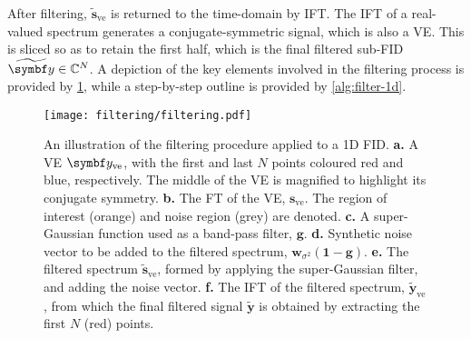 After filtering, $\widetilde{\symbf{s}}_{\text{ve}}$ is returned to the
time-domain by \ac{IFT}. The \ac{IFT} of a real-valued spectrum generates a
conjugate-symmetric signal, which is also a \ac{VE}. This is sliced so as to
retain the first half, which is the final filtered sub-FID $\widetilde{\by} \in
\mathbb{C}^{N}$.
A depiction of the key elements involved in the filtering process is provided
by \cref{fig:filtering}, while a step-by-step outline is provided by
\cref{alg:filter-1d}.
\begin{figure}
     \centering
     \texttt{[image: filtering/filtering.pdf]}
     \caption[
         An illustration of the filtering procedure applied to a \acs{1D}
         \acs{FID}.
     ]{
         An illustration of the filtering procedure applied to a \ac{1D}
         \ac{FID}.
         \textbf{a.} A \ac{VE} $\by_{\text{ve}}$, with the first and last
         $N$ points coloured red and blue, respectively. The middle of the
         \ac{VE} is magnified to highlight its conjugate symmetry.
         \textbf{b.} The \ac{FT} of the \ac{VE}, $\symbf{s}_{\text{ve}}$.
         The region of interest (orange) and noise region (grey) are denoted.
         \textbf{c.} A super-Gaussian function used as a band-pass filter,
         $\symbf{g}$.
         \textbf{d.} Synthetic noise vector to be added to the filtered
         spectrum, $\symbf{w}_{\sigma^2} (\symbf{1} - \symbf{g})$.
         \textbf{e.} The filtered spectrum $\widetilde{\symbf{s}}_{\text{ve}}$,
         formed by applying the super-Gaussian filter, and adding the noise
         vector.
         \textbf{f.} The \ac{IFT} of the filtered spectrum,
         $\widetilde{\symbf{y}}_{\text{ve}}$, from which the final filtered
         signal $\widetilde{\symbf{y}}$ is obtained by extracting
         the first $N$ (red) points.
     }
     \label{fig:filtering}
\end{figure}

